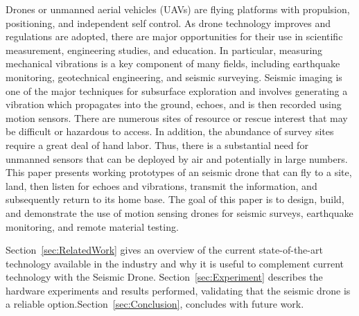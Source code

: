 Drones or unmanned aerial vehicles (UAVs) are flying
platforms with propulsion, positioning, and independent self control.
As drone technology improves and regulations are
adopted, there are major opportunities for their use in scientific
measurement, engineering studies, and education. In particular,
measuring mechanical vibrations is a key component of many
fields, including earthquake monitoring, geotechnical engineering,
and seismic surveying. Seismic imaging is one of the
major techniques for subsurface exploration
and involves generating a vibration which propagates
into the ground, echoes, and is then recorded using motion
sensors. There are numerous sites of resource or rescue interest
that may be difficult or hazardous to access. In addition, the abundance of survey sites require a great deal
of hand labor. Thus, there is a substantial need for unmanned
sensors that can be deployed by air and potentially in large
numbers. This paper presents working prototypes of an seismic drone that can fly to a site, land, then
listen for echoes and vibrations, transmit the information, and
subsequently return to its home base.
The goal of this paper is to design, build, and demonstrate
the use of motion sensing drones for seismic surveys, earthquake monitoring, and remote material testing. 

Section~\ref{sec:RelatedWork}  gives an overview of  the current state-of-the-art technology available in the industry and why it is useful to complement current technology  with the Seismic Drone.
Section~\ref{sec:Experiment} describes the hardware experiments and results performed, validating that the seismic drone is a reliable option.Section~\ref{sec:Conclusion}, concludes with future work.

